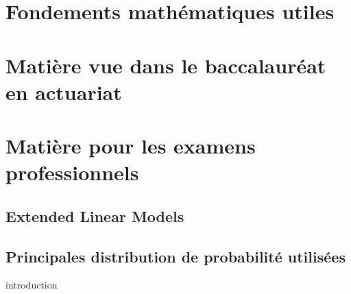 \documentclass[12pt, french]{book}
\begin{document}


\frontmatter %



{
    \hypersetup{linkcolor=tocColor}
    \bfseries %
    \tableofcontents
}
\newpage

\mainmatter %

\part{Fondements mathématiques utiles}


\label{Chapter:NotionCalculs}


\label{Chapter:AlgebreLineaire}


\part{Matière vue dans le baccalauréat en actuariat}


\label{Chapter:ProbEtStatistique}


\label{Chapter:MathematiqueFinanciere}


\label{Chapter:ProcessusAleatoires}


\label{Chapter:TheorieDuRisque}


\part{Matière pour les examens professionnels}


\label{Chapter:SerieChronologique}

\chapter{Extended Linear Models}

\label{Chapter:ExtendedLinearModels}

\appendix
\chapter{Principales distribution de probabilité utilisées}
introduction


\label{Appendix:PreuveImportante}


\label{Appendix:GitWorkflow}
\end{document}
